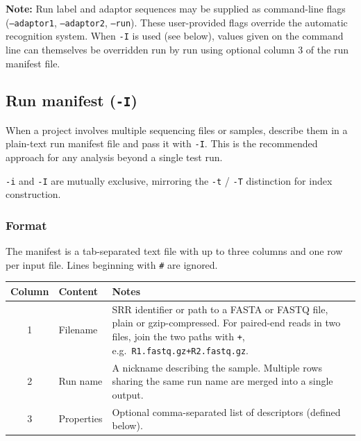 \documentclass[11pt]{article}
\newcommand{\code}[1]{\texttt{#1}}
\begin{document}
\begin{notebox}
\textbf{Note:} Run label and adaptor sequences may be supplied as command-line flags
(\code{--adaptor1}, \code{--adaptor2}, \code{--run}).
These user-provided flags override the automatic recognition system.
When \code{-I} is used (see below), values given on the command line
can themselves be overridden run by run using optional column 3 of the run manifest file.
\end{notebox}


\subsection{Run manifest (\code{-I})}
\label{sec:rconfig}

When a project involves multiple sequencing files or samples, describe
them in a plain-text run manifest file and pass it with \code{-I}.
This is the recommended approach for any analysis beyond a single test run.

\code{-i} and \code{-I} are mutually exclusive, mirroring the
\code{-t} / \code{-T} distinction for index construction.

\subsubsection{Format}

The manifest is a tab-separated text file with up to three columns and
one row per input file.  Lines beginning with \code{\#} are ignored.

\begin{center}
\begin{tabular}{clp{8.5cm}}
\toprule
\textbf{Column} & \textbf{Content} & \textbf{Notes} \\
\midrule
1 & Filename & SRR identifier or path to a FASTA or FASTQ file, plain or gzip-compressed.
               For paired-end reads in two files, join the two paths with
               \code{+}, e.g.\ \code{R1.fastq.gz+R2.fastq.gz}. \\
2 & Run name & A nickname describing the sample.
               Multiple rows sharing the same run name are merged into
               a single output. \\
3 & Properties & Optional comma-separated list of descriptors
                 (defined below). \\
\bottomrule
\end{tabular}
\end{center}
\end{document}
